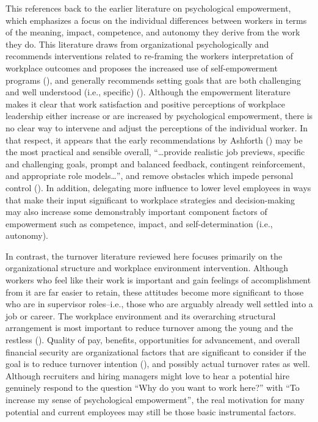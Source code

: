 \documentclass[
  11pt,
  a4paper,
]{article}
\begin{document}
This references back to the earlier literature on psychological
empowerment, which emphasizes a focus on the individual differences
between workers in terms of the meaning, impact, competence, and
autonomy they derive from the work they do. This literature draws from
organizational psychologically and recommends interventions related to
re-framing the workers interpretation of workplace outcomes and proposes
the increased use of self-empowerment programs
(), and generally
recommends setting goals that are both challenging and well understood
(i.e., specific) (). Although the
empowerment literature makes it clear that work satisfaction and
positive perceptions of workplace leadership either increase or are
increased by psychological empowerment, there is no clear way to
intervene and adjust the perceptions of the individual worker. In that
respect, it appears that the early recommendations by Ashforth
() may be the most practical and
sensible overall, ``\ldots provide realistic job previews, specific and
challenging goals, prompt and balanced feedback, contingent
reinforcement, and appropriate role models\ldots{}'', and remove
obstacles which impede personal control
(). In addition, delegating more
influence to lower level employees in ways that make their input
significant to workplace strategies and decision-making may also
increase some demonstrably important component factors of empowerment
such as competence, impact, and self-determination (i.e., autonomy).

In contrast, the turnover literature reviewed here focuses primarily on
the organizational structure and workplace environment intervention.
Although workers who feel like their work is important and gain feelings
of accomplishment from it are far easier to retain, these attitudes
become more significant to those who are in supervisor roles--i.e.,
those who are arguably already well settled into a job or career. The
workplace environment and its overarching structural arrangement is most
important to reduce turnover among the young and the restless
(). Quality of pay, benefits,
opportunities for advancement, and overall financial security are
organizational factors that are significant to consider if the goal is
to reduce turnover intention (), and possibly actual turnover rates as well.
Although recruiters and hiring managers might love to hear a potential
hire genuinely respond to the question ``Why do you want to work here?''
with ``To increase my sense of psychological empowerment'', the real
motivation for many potential and current employees may still be those
basic instrumental factors.
\end{document}
